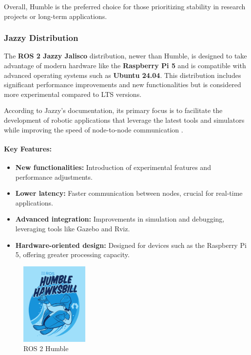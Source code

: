 Overall, Humble is the preferred choice for those prioritizing stability in research projects or long-term applications.

\subsubsection{Jazzy Distribution}

The \textbf{ROS 2 Jazzy Jalisco} distribution, newer than Humble, is designed to take advantage of modern hardware like the \textbf{Raspberry Pi 5} and is compatible with advanced operating systems such as \textbf{Ubuntu 24.04}. This distribution includes significant performance improvements and new functionalities but is considered more experimental compared to LTS versions.

According to Jazzy's documentation, its primary focus is to facilitate the development of robotic applications that leverage the latest tools and simulators while improving the speed of node-to-node communication \cite{jazzy_documentation}.

\paragraph{Key Features:}
\begin{itemize}
    \item \textbf{New functionalities:} Introduction of experimental features and performance adjustments.
    \item \textbf{Lower latency:} Faster communication between nodes, crucial for real-time applications.
    \item \textbf{Advanced integration:} Improvements in simulation and debugging, leveraging tools like Gazebo and Rviz.
    \item \textbf{Hardware-oriented design:} Designed for devices such as the Raspberry Pi 5, offering greater processing capacity.
\end{itemize}

\begin{figure}[H]
    \centering
    \includegraphics[width=0.3\textwidth]{pictures/humble_logo.png}
    \caption{ROS 2 Humble}
    \label{fig:imagen1}
\end{figure}

